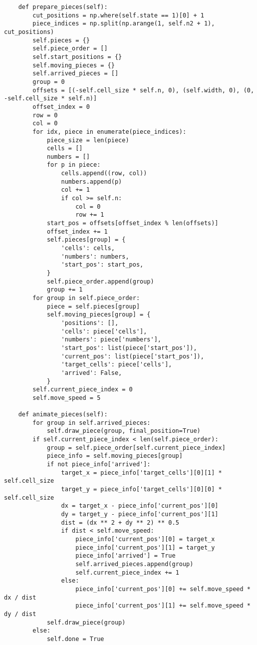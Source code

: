 \begin{lstlisting}
    def prepare_pieces(self):
        cut_positions = np.where(self.state == 1)[0] + 1
        piece_indices = np.split(np.arange(1, self.n2 + 1), cut_positions)
        self.pieces = {}
        self.piece_order = []
        self.start_positions = {}
        self.moving_pieces = {}
        self.arrived_pieces = []
        group = 0
        offsets = [(-self.cell_size * self.n, 0), (self.width, 0), (0, -self.cell_size * self.n)]
        offset_index = 0
        row = 0
        col = 0
        for idx, piece in enumerate(piece_indices):
            piece_size = len(piece)
            cells = []
            numbers = []
            for p in piece:
                cells.append((row, col))
                numbers.append(p)
                col += 1
                if col >= self.n:
                    col = 0
                    row += 1
            start_pos = offsets[offset_index % len(offsets)]
            offset_index += 1
            self.pieces[group] = {
                'cells': cells,
                'numbers': numbers,
                'start_pos': start_pos,
            }
            self.piece_order.append(group)
            group += 1
        for group in self.piece_order:
            piece = self.pieces[group]
            self.moving_pieces[group] = {
                'positions': [],
                'cells': piece['cells'],
                'numbers': piece['numbers'],
                'start_pos': list(piece['start_pos']),
                'current_pos': list(piece['start_pos']),
                'target_cells': piece['cells'],
                'arrived': False,
            }
        self.current_piece_index = 0
        self.move_speed = 5

    def animate_pieces(self):
        for group in self.arrived_pieces:
            self.draw_piece(group, final_position=True)
        if self.current_piece_index < len(self.piece_order):
            group = self.piece_order[self.current_piece_index]
            piece_info = self.moving_pieces[group]
            if not piece_info['arrived']:
                target_x = piece_info['target_cells'][0][1] * self.cell_size
                target_y = piece_info['target_cells'][0][0] * self.cell_size
                dx = target_x - piece_info['current_pos'][0]
                dy = target_y - piece_info['current_pos'][1]
                dist = (dx ** 2 + dy ** 2) ** 0.5
                if dist < self.move_speed:
                    piece_info['current_pos'][0] = target_x
                    piece_info['current_pos'][1] = target_y
                    piece_info['arrived'] = True
                    self.arrived_pieces.append(group)
                    self.current_piece_index += 1
                else:
                    piece_info['current_pos'][0] += self.move_speed * dx / dist
                    piece_info['current_pos'][1] += self.move_speed * dy / dist
            self.draw_piece(group)
        else:
            self.done = True


\end{lstlisting}
